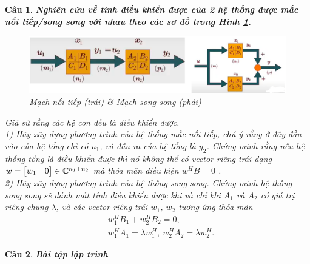 \documentclass[11pt]{article}
\newtheorem{bt}{Câu}
\begin{document}
\begin{bt} \textbf{Nghiên cứu về tính điều khiển được của 2 hệ thống được mắc nối tiếp/song song với nhau theo các sơ đồ trong Hình \ref{fig:electricalconnection}.} \\

\begin{figure}[!h]
	\centering
	\includegraphics[scale = 0.6]{Figures/Electrical_connection}
	\caption{Mạch nối tiếp (trái) \& Mạch song song (phải)}
	\label{fig:electricalconnection}
\end{figure}

\noindent Giả sử rằng các hệ con đều là điều khiển được. \\
1) Hãy xây dựng phương trình của hệ thống mắc nối tiếp, chú ý rằng ở đây đầu vào của hệ tổng chỉ có $u_1$, và đầu ra của hệ tổng là $y_2$. Chứng minh rằng nếu hệ thống tổng là điều khiển được thì nó không thể có vector riêng trái dạng $w = \begin{bmatrix} w_1 & 0 \end{bmatrix} \in \mathbb{C}^{n_1+n_2}$ mà thỏa mãn điều kiện $w^H B= 0$ . \\
2) Hãy xây dựng phương trình của hệ thống song song. Chứng minh hệ thống song song sẽ đánh mất tính điều khiển được khi và chỉ khi $A_1$ và $A_2$ có giá trị riêng chung $\lambda$, và các vector riêng trái $w_1$, $w_2$ tương ứng thỏa mãn
\begin{align*}
	& w^H_1 B_1 + w^H_2 B_2 = 0, \\
	& w^H_1 A_1 = \lambda w^H_1,   \   w^H_2 A_2 = \lambda w^H_2.
\end{align*}
\end{bt}


\begin{bt} \textbf{Bài tập lập trình} \\
\end{bt}   

	
\end{document}

